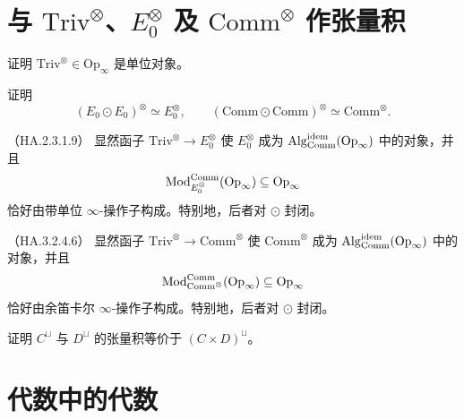 \section{与 $\mathrm{Triv}^{\otimes}$、$E_{0}^{\otimes}$ 及 $\mathrm{Comm}^{\otimes}$ 作张量积}

\begin{exercise}\label{L26-2.1}
证明 $\mathrm{Triv}^{\otimes}\in\mathrm{Op}_{\infty}$ 是单位对象。
\end{exercise}

\begin{exercise}\label{L26-2.2}
证明
\[
(E_{0}\odot E_{0})^{\otimes}\simeq E_{0}^{\otimes},\qquad
(\mathrm{Comm}\odot\mathrm{Comm})^{\otimes}\simeq\mathrm{Comm}^{\otimes}.
\]
\end{exercise}

\begin{proposition}\label{L26-2.3}（HA.2.3.1.9）
显然函子 $\mathrm{Triv}^{\otimes}\to E_{0}^{\otimes}$ 使 $E_{0}^{\otimes}$ 成为 $\operatorname{Alg}^{\mathrm{idem}}_{\mathrm{Comm}}(\mathrm{Op}_{\infty})$ 中的对象，并且
\[
\operatorname{Mod}^{\mathrm{Comm}}_{E_{0}^{\otimes}}(\mathrm{Op}_{\infty})\subseteq\mathrm{Op}_{\infty}
\]
恰好由带单位 $\infty$-操作子构成。特别地，后者对 $\odot$ 封闭。
\end{proposition}


\begin{proposition}\label{L26-2.4}（HA.3.2.4.6）
显然函子 $\mathrm{Triv}^{\otimes}\to\mathrm{Comm}^{\otimes}$ 使 $\mathrm{Comm}^{\otimes}$ 成为 $\operatorname{Alg}^{\mathrm{idem}}_{\mathrm{Comm}}(\mathrm{Op}_{\infty})$ 中的对象，并且
\[
\operatorname{Mod}^{\mathrm{Comm}}_{\mathrm{Comm}^{\otimes}}(\mathrm{Op}_{\infty})\subseteq\mathrm{Op}_{\infty}
\]
恰好由余笛卡尔 $\infty$-操作子构成。特别地，后者对 $\odot$ 封闭。
\end{proposition}

\begin{exercise}\label{L26-2.5}
证明 $C^{\sqcup}$ 与 $D^{\sqcup}$ 的张量积等价于 $(C\times D)^{\sqcup}$。
\end{exercise}

\section{代数中的代数}

